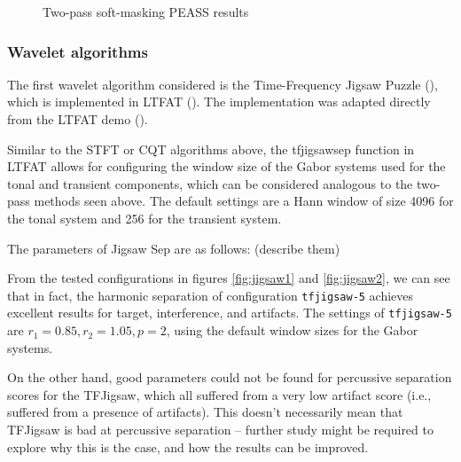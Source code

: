 \documentclass[10pt,letter]{article}
\begin{document}
\begin{figure}
	\centering
	\vspace{-1.25em}
	\caption{Two-pass soft-masking PEASS results}
	\label{fig:vocalround1soft}
\end{figure}

\subsubsection{Wavelet algorithms}

The first wavelet algorithm considered is the Time-Frequency Jigsaw Puzzle (\cite{tfjigsaw}), which is implemented in LTFAT (\cite{tfjigsaw2}). The implementation was adapted directly from the LTFAT demo (\cite{tfjigsaw3}).

Similar to the STFT or CQT algorithms above, the tfjigsawsep function in LTFAT allows for configuring the window size of the Gabor systems used for the tonal and transient components, which can be considered analogous to the two-pass methods seen above. The default settings are a Hann window of size 4096 for the tonal system and 256 for the transient system.

The parameters of Jigsaw Sep are as follows: (describe them)

From the tested configurations in figures \ref{fig:jigsaw1} and \ref{fig:jigsaw2}, we can see that in fact, the harmonic separation of configuration \Verb#tfjigsaw-5# achieves excellent results for target, interference, and artifacts. The settings of \Verb#tfjigsaw-5# are $r_{1} = 0.85, r_{2} = 1.05, p = 2$, using the default window sizes for the Gabor systems.

On the other hand, good parameters could not be found for percussive separation scores for the TFJigsaw, which all suffered from a very low artifact score (i.e., suffered from a presence of artifacts). This doesn't necessarily mean that TFJigsaw  is bad at percussive separation -- further study might be required to explore why this is the case, and how the results can be improved.
\end{document}
